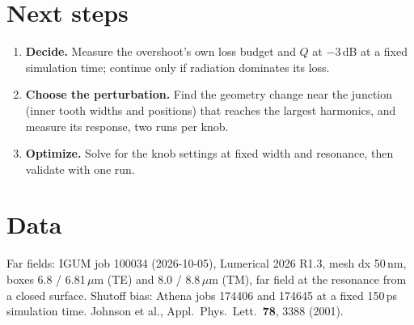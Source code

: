\documentclass[11pt]{article}
\begin{document}
\section{Next steps}
\begin{enumerate}
\item \textbf{Decide.} Measure the overshoot's own loss budget and $Q$ at $-3$\,dB at a fixed simulation time; continue only if radiation dominates its loss.
\item \textbf{Choose the perturbation.} Find the geometry change near the junction (inner tooth widths and positions) that reaches the largest harmonics, and measure its response, two runs per knob.
\item \textbf{Optimize.} Solve for the knob settings at fixed width and resonance, then validate with one run.
\end{enumerate}

\section*{Data}
Far fields: IGUM job 100034 (2026-10-05), Lumerical 2026 R1.3, mesh dx 50\,nm, boxes 6.8 / 6.81\,$\mu$m (TE) and 8.0 / 8.8\,$\mu$m (TM), far field at the resonance from a closed surface. Shutoff bias: Athena jobs 174406 and 174645 at a fixed 150\,ps simulation time. Johnson et al., Appl.\ Phys.\ Lett.\ \textbf{78}, 3388 (2001).
\end{document}
